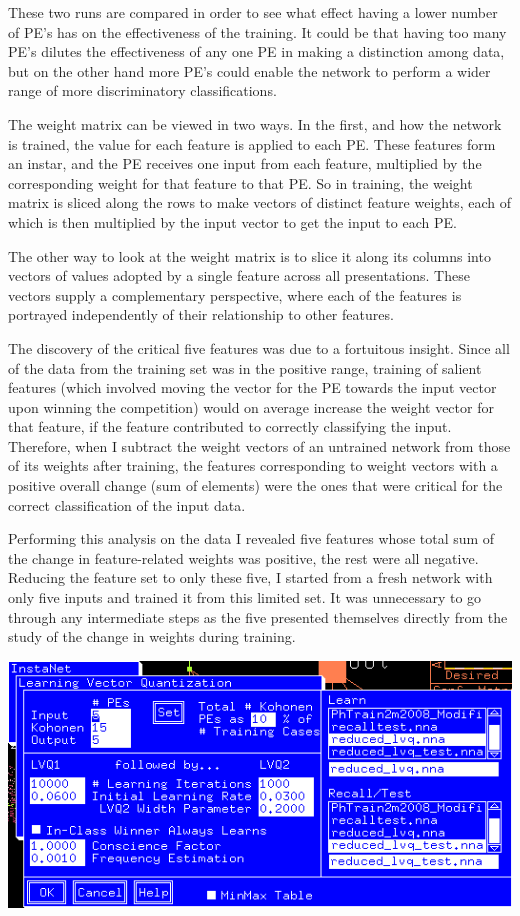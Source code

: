 \documentclass[12pt]{article}
\begin{document}
These two runs are compared in order to see what effect having a lower number of PE's has on the effectiveness of the training.  It could be that having too many PE's dilutes the effectiveness of any one PE in making a distinction among data, but on the other hand more PE's could enable the network to perform a wider range of more discriminatory classifications.  

The weight matrix can be viewed in two ways.  In the first, and how the network is trained, the value for each feature is applied to each PE.  These features form an instar, and the PE receives one input from each feature, multiplied by the corresponding weight for that feature to that PE.  So in training, the weight matrix is sliced along the rows to make vectors of distinct feature weights, each of which is then multiplied by the input vector to get the input to each PE.

The other way to look at the weight matrix is to slice it along its columns into vectors of values adopted by a single feature across all presentations.  These vectors supply a complementary perspective, where each of the features is portrayed independently of their relationship to other features.  

The discovery of the critical five features was due to a fortuitous insight.  Since all of the data from the training set was in the positive range, training of salient features (which involved moving the vector for the PE towards the input vector upon winning the competition) would on average increase the weight vector for that feature, if the feature contributed to correctly classifying the input.  Therefore, when I subtract the weight vectors of an untrained network from those of its weights after training, the features corresponding to weight vectors with a positive overall change (sum of elements) were the ones that were critical for the correct classification of the input data.    

Performing this analysis on the data I revealed five features whose total sum of the change in feature-related weights was positive, the rest were all negative.  Reducing the feature set to only these five, I started from a fresh network with only five inputs and trained it from this limited set.  It was unnecessary to go through any intermediate steps as the five presented themselves directly from the study of the change in weights during training.

\begin{center}
\includegraphics[scale=0.7]{parameters5features.png}
\end{center}
\end{document}
